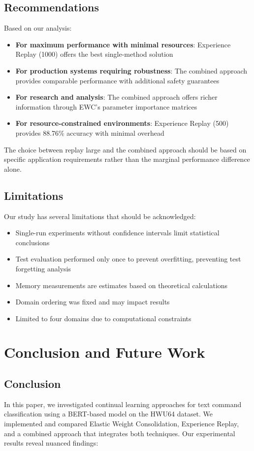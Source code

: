 \documentclass[conference]{IEEEtran}
\begin{document}
\subsection{Recommendations}
Based on our analysis:

\begin{itemize}
    \item \textbf{For maximum performance with minimal resources}: Experience Replay (1000) offers the best single-method solution
    \item \textbf{For production systems requiring robustness}: The combined approach provides comparable performance with additional safety guarantees
    \item \textbf{For research and analysis}: The combined approach offers richer information through EWC's parameter importance matrices
    \item \textbf{For resource-constrained environments}: Experience Replay (500) provides 88.76\% accuracy with minimal overhead
\end{itemize}

The choice between replay large and the combined approach should be based on specific application requirements rather than the marginal performance difference alone.

\subsection{Limitations}
Our study has several limitations that should be acknowledged:

\begin{itemize}
    \item Single-run experiments without confidence intervals limit statistical conclusions
    \item Test evaluation performed only once to prevent overfitting, preventing test forgetting analysis
    \item Memory measurements are estimates based on theoretical calculations
    \item Domain ordering was fixed and may impact results
    \item Limited to four domains due to computational constraints
\end{itemize}

\section{Conclusion and Future Work}
\subsection{Conclusion}
In this paper, we investigated continual learning approaches for text command classification using a BERT-based model on the HWU64 dataset. We implemented and compared Elastic Weight Consolidation, Experience Replay, and a combined approach that integrates both techniques. Our experimental results reveal nuanced findings:
\end{document}
